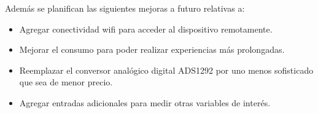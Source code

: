 Además se planifican las siguientes mejoras a futuro relativas a:

\begin{itemize}

\item Agregar conectividad wifi para acceder al dispositivo remotamente.

\item Mejorar el consumo para poder realizar experiencias más prolongadas.

\item Reemplazar el conversor analógico digital ADS1292 por uno menos sofisticado que sea de menor precio.

\item Agregar entradas adicionales para medir otras variables de interés.

\end{itemize}